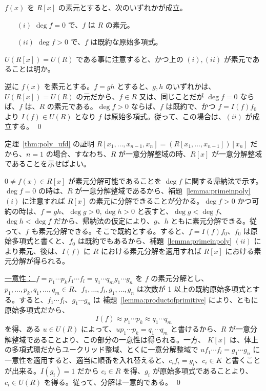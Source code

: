 \begin{lemma} \label{lemma:primeinpoly}
$f(x)$ を $R[x]$ の素元とすると、次のいずれかが成立。
\begin{itemize}
\item[$(i)$] $\deg f = 0$ で、$f$ は $R$ の素元。
\item[$(ii)$] $\deg f>0$ で、$f$ は既約な原始多項式。
\end{itemize}
\end{lemma}
\proof
$U(R[x]) = U(R)$ である事に注意すると、かつ上の $(i),(ii)$ が素元であることは明か。

逆に $f(x)$ を素元とする。$f = gh$ とすると、$g, h$ のいずれかは、$U(R[x]) = U(R)$ の元だから、$f\in R$ 又は、同じことだが $\deg f = 0$ ならば、$f$ は、$R$ の素元である。$\deg f >0$ ならば、$f$ は既約で、かつ $f = I(f)f_0$ より $I(f)\in U(R)$ となり $f$ は原始多項式。従って、この場合は、$(ii)$ が成立する。
\qed

\medskip
{\gt 定理~\ref{thm:poly_ufd} の証明\quad}
$R[x_1,\ldots, x_{n-1},x_n] = (R[x_1,\ldots,x_{n-1}])[x_{n}]$ だから、$n = 1$ の場合、すなわち、$R$ が一意分解整域の時、$R[x]$ が一意分解整域であることを示せばよい。

$0\neq f(x)\in R[x]$ が素元分解可能であることを $\deg f$ に関する帰納法で示す。$\deg f = 0$ の時は、$R$ が一意分解整域であるから、補題~\ref{lemma:primeinpoly} $(i)$ に注意すれば $R[x]$ の素元に分解できることが分かる。$\deg f > 0$ かつ可約の時は、$f = gh$、$\deg g>0, \deg h>0$ と表すと、$\deg g<\deg f$、$\deg h<\deg f$ だから、帰納法の仮定により、$g$、$h$ ともに素元分解できる。従って、$f$ も素元分解できる。そこで既約とする。すると、$f = I(f)f_0$、$f_0$ は原始多項式と書くと、$f_0$ は既約でもあるから、補題~\ref{lemma:primeinpoly} $(ii)$ により素元、後は、$I(f)$ に $R$ における素元分解を適用すれば $R[x]$ における素元分解が得られる。

\underline{一意性： }
$f = p_1\cdots p_kf_1\cdots f_l = q_1\cdots q_mg_1\cdots g_n$ を $f$ の素元分解とし、\\
$p_1, \ldots, p_k, q_1, \ldots, q_m\in R$、$f_1, \ldots, f_l, g_1, \ldots, g_n$ は次数が 1 以上の既約原始多項式とする。すると、$f_1\cdots f_l$、$g_1\cdots g_n$ は 補題~\ref{lemma:productofprimitive} により、ともに原始多項式だから、
$$I(f) \approx p_1\cdots p_k \approx q_1\cdots q_m$$
を得、ある $u\in U(R)$ によって、$up_1\cdots p_k = q_1\cdots q_m$ と書けるから、$R$ が一意分解整域であることより、この部分の一意性は得られる。一方、
$K[x]$ は、体上の多項式環だからユークリッド整域、とくに一意分解整域で $uf_1\cdots f_l = g_1\cdots g_n$ に一意性を適用すると、適当に順番を入れ替えると、$c_if_i = g_i$、$c_i\in K$ と書くことが出来る。$I(g_i) = 1$ だから $c_i\in R$ を得、$g_i$ が原始多項式であることより、$c_i\in U(R)$ を得る。従って、分解は一意的である。
\qed


